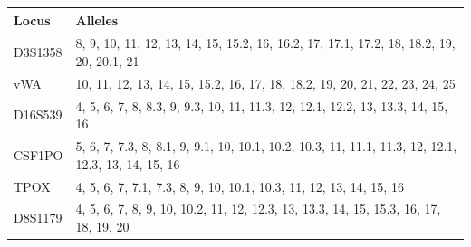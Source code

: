 \begin{theappendices}
\begin{table}
\centering
\begin{tabularx}{\textwidth}{lX}
\toprule
   Locus &                                                                                                                                                                                                                                                                                                                                                      Alleles \\
\midrule
 D3S1358 &                                                                                                                                                                                                                                                                     8, 9, 10, 11, 12, 13, 14, 15, 15.2, 16, 16.2, 17, 17.1, 17.2, 18, 18.2, 19, 20, 20.1, 21 \\
     vWA &                                                                                                                                                                                                                                                                                   10, 11, 12, 13, 14, 15, 15.2, 16, 17, 18, 18.2, 19, 20, 21, 22, 23, 24, 25 \\
 D16S539 &                                                                                                                                                                                                                                                                               4, 5, 6, 7, 8, 8.3, 9, 9.3, 10, 11, 11.3, 12, 12.1, 12.2, 13, 13.3, 14, 15, 16 \\
  CSF1PO &                                                                                                                                                                                                                                                           5, 6, 7, 7.3, 8, 8.1, 9, 9.1, 10, 10.1, 10.2, 10.3, 11, 11.1, 11.3, 12, 12.1, 12.3, 13, 14, 15, 16 \\
    TPOX &                                                                                                                                                                                                                                                                                           4, 5, 6, 7, 7.1, 7.3, 8, 9, 10, 10.1, 10.3, 11, 12, 13, 14, 15, 16 \\
 D8S1179 &                                                                                                                                                                                                                                                                         4, 5, 6, 7, 8, 9, 10, 10.2, 11, 12, 12.3, 13, 13.3, 14, 15, 15.3, 16, 17, 18, 19, 20 \\

\end{tabularx}
\end{table}
\end{theappendices}

